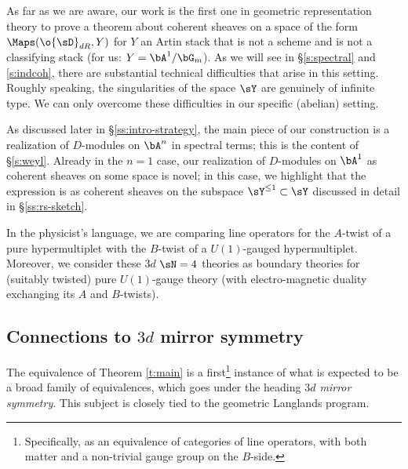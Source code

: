\begin{rem}
\notready

As far as we are aware, our work is the first one in geometric representation
theory to prove a theorem about coherent sheaves on a
space of the form $\Maps(\o{\sD}_{dR},Y)$ for $Y$ an Artin stack
that is not a scheme and is not a classifying stack (for us: $Y = \bA^1/\bG_m$).
As we will see in \S \ref{s:spectral} and \ref{s:indcoh}, there are substantial
technical difficulties that arise in this setting.
Roughly speaking, the singularities of the space $\sY$ are genuinely of infinite type.
We can only overcome these difficulties in our specific (abelian) setting.

\end{rem}

\begin{rem}
\notready

As discussed later in \S \ref{ss:intro-strategy}, the main piece of our
construction is a realization of $D$-modules on $\bA^n$ in spectral terms;
this is the content of \S \ref{s:weyl}.
Already in the $n = 1$ case, our realization of $D$-modules on
$\bA^1$ as coherent sheaves on some space is novel; in this case,
we highlight that the expression
is as coherent sheaves on the subspace $\sY^{\leq 1} \subset \sY$
discussed in detail in  \S \ref{ss:rs-sketch}.

\end{rem}

\begin{rem}
\notready

In the physicist's language, we are
comparing line operators for the $A$-twist of a pure hypermultiplet
with the $B$-twist of a $U(1)$-gauged hypermultiplet. Moreover, we
consider these $3d$ $\sN = 4$ theories as boundary theories for
(suitably twisted) pure $U(1)$-gauge theory (with electro-magnetic duality
exchanging its $A$ and $B$-twists).

\end{rem}

\subsection{Connections to $3d$ mirror symmetry}

The equivalence of Theorem \ref{t:main} is a first\footnote{Specifically,
as an equivalence of categories of line operators, with both matter and
a non-trivial gauge group on the $B$-side.}
instance of what is expected to be a broad family of equivalences,
which goes under the heading
\emph{$3d$ mirror symmetry}.
This subject is closely tied to the geometric Langlands program.

